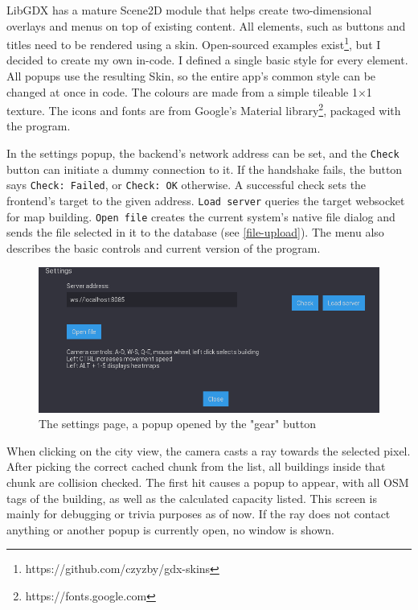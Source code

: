 LibGDX has a mature Scene2D module that helps create two-dimensional overlays and menus on top of existing content. All elements, such as buttons and titles need to be rendered using a skin. Open-sourced examples exist\footnote{https://github.com/czyzby/gdx-skins}, but I decided to create my own in-code. I defined a single basic style for every element. All popups use the resulting Skin, so the entire app's common style can be changed at once in code. The colours are made from a simple tileable 1$\times$1 texture. The icons and fonts are from Google's Material library\footnote{https://fonts.google.com}, packaged with the program.

In the settings popup, the backend's network address can be set, and the \verb|Check| button can initiate a dummy connection to it. If the handshake fails, the button says \verb|Check: Failed|, or \verb|Check: OK| otherwise. A successful check sets the frontend's target to the given address. \verb|Load server| queries the target websocket for map building. \verb|Open file| creates the current system's native file dialog and sends the file selected in it to the database (see \ref{file-upload}). The menu also describes the basic controls and current version of the program. %

\begin{figure}[!ht]
    \centering
    \includegraphics[width=150mm, keepaspectratio]{images/settings.png}
    \caption{The settings page, a popup opened by the "gear" button}
\end{figure}

When clicking on the city view, the camera casts a ray towards the selected pixel. After picking the correct cached chunk from the list, all buildings inside that chunk are collision checked. The first hit causes a popup to appear, with all OSM tags of the building, as well as the calculated capacity listed. This screen is mainly for debugging or trivia purposes as of now. If the ray does not contact anything or another popup is currently open, no window is shown.